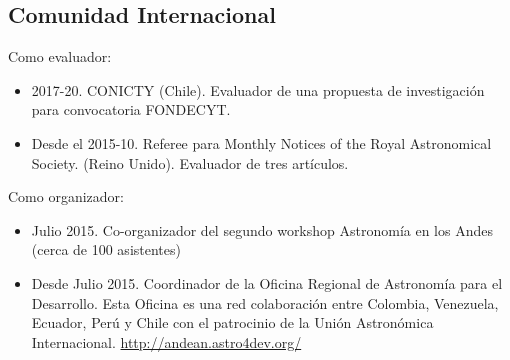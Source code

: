 \documentclass{article}
\begin{document}
\subsection{Comunidad Internacional}

Como evaluador:
\begin{itemize}
\item 2017-20. CONICTY (Chile). Evaluador de una propuesta de
  investigaci\'on para convocatoria FONDECYT.
\item Desde el 2015-10. Referee para Monthly Notices of the Royal
  Astronomical Society. (Reino Unido). Evaluador de tres art\'iculos.
\end{itemize}


Como organizador:
\begin{itemize}
\item {Julio 2015. Co-organizador del segundo workshop Astronom\'ia en los Andes
  (cerca de 100 asistentes)}
\item {Desde Julio 2015. Coordinador de la Oficina Regional de
  Astronom\'ia para el Desarrollo. Esta Oficina es una red
  colaboraci\'on entre Colombia, Venezuela, Ecuador, Per\'u y Chile
  con el patrocinio de la Uni\'on Astron\'omica Internacional. 
\url{http://andean.astro4dev.org/}}    
\end{itemize}
\end{document}
